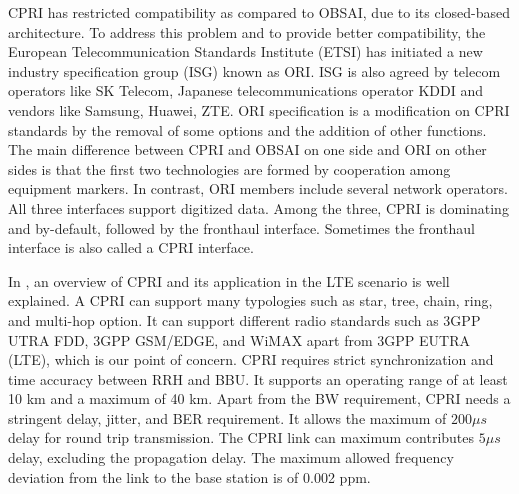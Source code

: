 \begin{multicols}{2}
CPRI has restricted compatibility as compared to OBSAI, due to its closed-based architecture. To address this problem and to provide better compatibility, the European Telecommunication Standards Institute (ETSI) has initiated a new industry specification group (ISG) known as ORI. ISG is also agreed by telecom operators like SK Telecom, Japanese telecommunications operator KDDI and vendors like Samsung, Huawei, ZTE. ORI specification is a modification on CPRI standards by the removal of some options and the addition of other functions. The main difference between CPRI and OBSAI on one side and ORI on other sides is that the first two technologies are formed by cooperation among equipment markers. In contrast, ORI members include several network operators. All three interfaces support digitized data. Among the three, CPRI is dominating and by-default, followed by the fronthaul interface. Sometimes the fronthaul interface is also called a CPRI interface.

In \cite{art3-key39}, an overview of CPRI and its application in the LTE scenario is well explained. A CPRI can support many typologies such as star, tree, chain, ring, and multi-hop option. It can support different radio standards such as 3GPP UTRA FDD, 3GPP GSM/EDGE, and WiMAX apart from 3GPP EUTRA (LTE), which is our point of concern. CPRI requires strict synchronization and time accuracy between RRH and BBU. It supports an operating range of at least 10 km and a maximum of 40 km. Apart from the BW requirement, CPRI needs a stringent delay, jitter, and BER requirement. It allows the maximum of $200 \mu s$ delay for round trip transmission. The CPRI link can maximum contributes $5 \mu s$ delay, excluding the propagation delay. The maximum allowed frequency deviation from the link to the base station is of 0.002 ppm.


\end{multicols}
